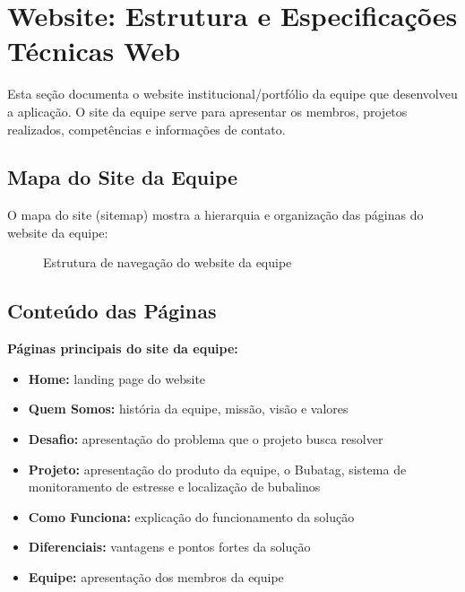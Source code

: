 \documentclass[11pt,a4paper]{article}
\begin{document}
\section{Website: Estrutura e Especificações Técnicas Web}

Esta seção documenta o website institucional/portfólio da equipe que desenvolveu a aplicação. O site da equipe serve para apresentar os membros, projetos realizados, competências e informações de contato.

\subsection{Mapa do Site da Equipe}

O mapa do site (sitemap) mostra a hierarquia e organização das páginas do website da equipe:

\begin{figure}[H]
\centering
{}
\caption{Estrutura de navegação do website da equipe}
\label{fig:sitemap}
\end{figure}

\subsection{Conteúdo das Páginas}

\textbf{Páginas principais do site da equipe:}

\begin{itemize}
    \item \textbf{Home:} landing page do website
    \item \textbf{Quem Somos:} história da equipe, missão, visão e valores
    \item \textbf{Desafio:} apresentação do problema que o projeto busca resolver
    \item \textbf{Projeto:} apresentação do produto da equipe, o Bubatag, sistema de monitoramento de estresse e localização de bubalinos
    \item \textbf{Como Funciona:} explicação do funcionamento da solução
    \item \textbf{Diferenciais:} vantagens e pontos fortes da solução
    \item \textbf{Equipe:} apresentação dos membros da equipe
\end{itemize}
\end{document}
